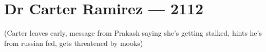 \hypertarget{dr-carter-ramirez-2112}{%
\chapter*{Dr Carter Ramirez — 2112}\label{dr-carter-ramirez-2112}}

(Carter leaves early, message from Prakash saying she's getting stalked, hints he's from russian fed, gets threatened by mooks)
